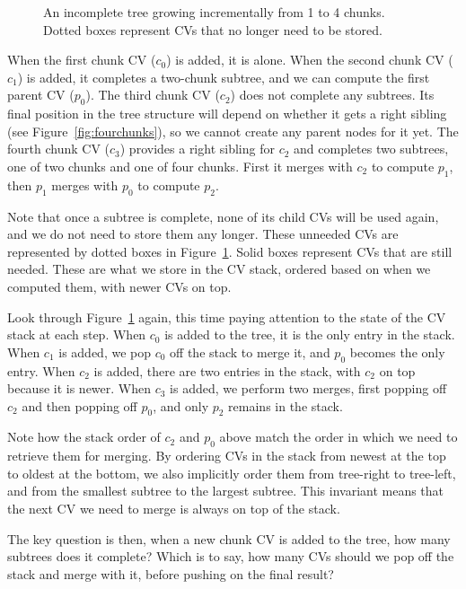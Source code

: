 \documentclass[11pt,notitlepage,a4paper]{article}
\begin{document}
\begin{figure}[h]
\centering

\caption{An incomplete tree growing incrementally from 1 to 4 chunks. Dotted
    boxes represent CVs that no longer need to be stored.}
\label{fig:incrementaltrees}
\end{figure}

When the first chunk CV ($c_0$) is added, it is alone. When the second chunk CV
($c_1$) is added, it completes a two-chunk subtree, and we can compute the
first parent CV ($p_0$). The third chunk CV ($c_2$) does not complete any
subtrees. Its final position in the tree structure will depend on whether it
gets a right sibling (see Figure~\ref{fig:fourchunks}), so we cannot create any
parent nodes for it yet. The fourth chunk CV ($c_3$) provides a right sibling
for $c_2$ and completes two subtrees, one of two chunks and one of four chunks.
First it merges with $c_2$ to compute $p_1$, then $p_1$ merges with $p_0$ to
compute $p_2$.

Note that once a subtree is complete, none of its child CVs will be used again,
and we do not need to store them any longer. These unneeded CVs are represented
by dotted boxes in Figure~\ref{fig:incrementaltrees}. Solid boxes represent CVs
that are still needed. These are what we store in the CV stack, ordered based
on when we computed them, with newer CVs on top.

Look through Figure~\ref{fig:incrementaltrees} again, this time paying
attention to the state of the CV stack at each step. When $c_0$ is added to the
tree, it is the only entry in the stack. When $c_1$ is added, we pop $c_0$ off
the stack to merge it, and $p_0$ becomes the only entry. When $c_2$ is added,
there are two entries in the stack, with $c_2$ on top because it is newer. When
$c_3$ is added, we perform two merges, first popping off $c_2$ and then popping
off $p_0$, and only $p_2$ remains in the stack.

Note how the stack order of $c_2$ and $p_0$ above match the order in which we
need to retrieve them for merging. By ordering CVs in the stack from newest at
the top to oldest at the bottom, we also implicitly order them from tree-right
to tree-left, and from the smallest subtree to the largest subtree. This
invariant means that the next CV we need to merge is always on top of the
stack.

The key question is then, when a new chunk CV is added to the tree, how many
subtrees does it complete? Which is to say, how many CVs should we pop off the
stack and merge with it, before pushing on the final result?
\end{document}
